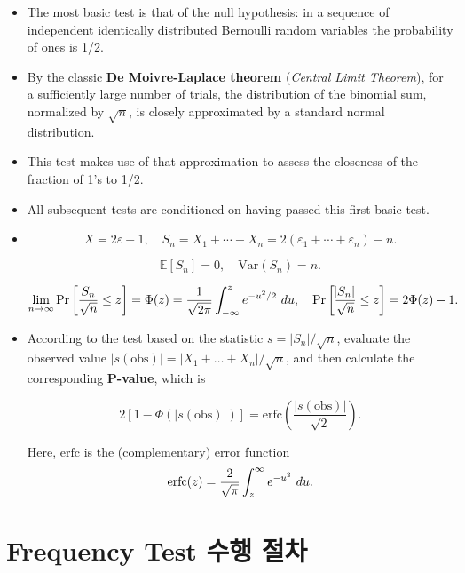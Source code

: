 \documentclass[12pt,openany]{book}
\theoremstyle{definition}
\begin{document}
	\begin{itemize}
		\item The most basic test is that of the null hypothesis: in a sequence of independent identically distributed Bernoulli random variables the probability of ones is 1/2.
		\item By the classic \textbf{De Moivre-Laplace theorem} (\textit{Central Limit Theorem}), for a sufficiently large number of trials, the distribution of the binomial sum, normalized by $\sqrt{n}$, is closely approximated by a standard normal distribution.
		\item This test makes use of that approximation to assess the closeness of the fraction of 1's to 1/2.
		\item All subsequent tests are conditioned on having passed this first basic test.
		\item 
		\[
		X = 2\varepsilon-1, \quad S_n = X_1 + \cdots + X_n = 2(\varepsilon_1 + \cdots + \varepsilon_n) - n.
		\]
		
		\[
		\mathbb{E}[S_n] = 0, \quad \text{Var}(S_n) = n.
		\]
		
		\[
		\lim\limits_{n\to\infty}\Pr\sbr{\frac{S_n}{\sqrt{n}}\leq z}=\Phi(z)=\frac{1}{\sqrt{2\pi}}\int_{-\infty}^{z}e^{-u^2/2}\ du,\quad \Pr\sbr{\frac{\abs{S_n}}{\sqrt{n}}\leq z}=2\Phi(z)-1.
		\]
		
		\item According to the test based on the statistic $s = |S_n|/\sqrt{n}$, evaluate the observed value $|s(\text{obs})| = |X_1 + \ldots + X_n|/\sqrt{n}$, and then calculate the corresponding \textbf{P-value}, which is
		
		\[
		2\left[1 - \Phi\left({|s(\text{obs})|}\right)\right] = \text{erfc}\left(\frac{|s(\text{obs})|}{\sqrt{2}}\right).
		\]
		
		Here, $\text{erfc}$ is the (complementary) error function \[
		\textnormal{erfc}(z)=\frac{2}{\sqrt{\pi}}\int_{z}^{\infty}e^{-u^2}\ du.
		\]
	\end{itemize}
	
	
	
	\section*{Frequency Test 수행 절차}
	
\end{document}
